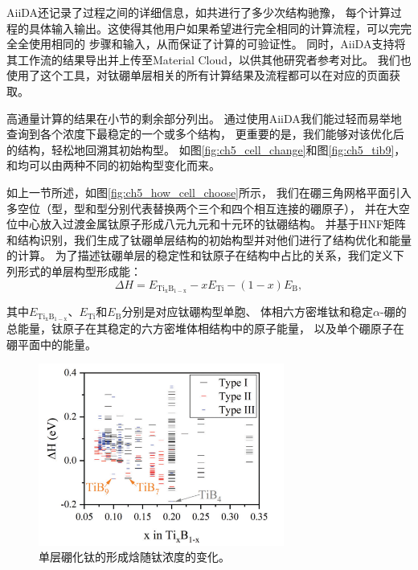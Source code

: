AiiDA还记录了过程之间的详细信息，如共进行了多少次结构驰豫，
每个计算过程的具体输入输出。这使得其他用户如果希望进行完全相同的计算流程，可以完完全全使用相同的
步骤和输入，从而保证了计算的可验证性。
同时，AiiDA支持将其工作流的结果导出并上传至Material Cloud\cite{talirz2020materials}，以供其他研究者参考对比。
我们也使用了这个工具，对钛硼单层相关的所有计算结果及流程都可以在对应的页面\cite{Materials-Cloud-Archive}获取。

高通量计算的结果在小节的剩余部分列出。
通过使用AiiDA我们能过轻而易举地查询到各个浓度下最稳定的一个或多个结构，
更重要的是，我们能够对该优化后的结构，轻松地回溯其初始构型。
如图\ref{fig:ch5_cell_change}和图\ref{fig:ch5_tib9}，
和均可以由两种不同的初始构型变化而来。

如上一节所述，如图\ref{fig:ch5_how_cell_choose}所示，
我们在硼三角网格平面引入多空位（型，型和型分别代表替换两个三个和四个相互连接的硼原子），
并在大空位中心放入过渡金属钛原子形成八元九元和十元环的钛硼结构。
并基于HNF矩阵和结构识别，我们生成了钛硼单层结构的初始构型并对他们进行了结构优化和能量的计算。
为了描述钛硼单层的稳定性和钛原子在结构中占比的关系，我们定义下列形式的单层构型形成能：
\begin{equation}
  \Delta H = E_{\mathrm{Ti_xB_{1-x}}} - xE_{\mathrm{Ti}} - (1-x)E_{\mathrm{B}},
\end{equation}

其中$E_{\mathrm{Ti_xB_{1-x}}}$、$E_{\mathrm{Ti}}$和$E_\mathrm{B}$分别是对应钛硼构型单胞、
体相六方密堆钛和稳定$\alpha$-硼的总能量，钛原子在其稳定的六方密堆体相结构中的原子能量，
以及单个硼原子在硼平面中的能量。

\begin{figure}[htb]
  \includegraphics[width=0.72\textwidth]{figs/ch5_energy_hull_a.png}
  \centering
  \caption{单层硼化钛的形成焓随钛浓度的变化。}
  \label{fig:ch5_energy_hull_a}
\end{figure}

